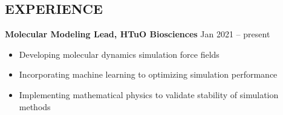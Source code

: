 \documentclass[11pt,letterpaper, sans]{article}
\newcommand{\newsec}[1]{\subsection*{\hspace{-1.5pt}\uppercase{#1}}}
\begin{document}
\begin{flushleft}
\newsec{Experience}

{\bf Molecular Modeling Lead,
HTuO Biosciences} 
\hfill Jan 2021 -- present
\vspace{-0.5em} \\
\begin{itemize}[leftmargin=*]\itemsep-0.2em
\item Developing molecular dynamics simulation force fields
\item Incorporating machine learning to optimizing simulation performance
\item Implementing mathematical physics to validate stability of simulation methods
\end{itemize}



\vspace{-1.5em}\ \


\end{flushleft}
\end{document}
